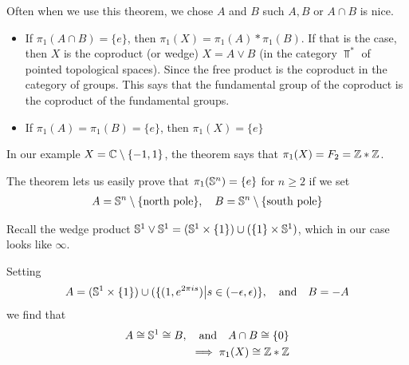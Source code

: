 
Often when we use this theorem, we chose $A$ and $B$ such $A,B$ or $A \cap B$ is nice.
\begin{itemize}
  \item If $\pi_1(A \cap B) = \{e\}$, then $\pi_1(X) = \pi_1(A) \ast \pi_1(B)$.
    If that is the case, then $X$ is the coproduct (or wedge) $X = A \vee B$ (in the category $\Top^{\ast}$ of pointed topological spaces).
    Since the free product is the coproduct in the category of groups. 
    This says that the fundamental group of the coproduct is the coproduct of the fundamental groups.
  \item If $\pi_1(A) = \pi_1(B) = \{e\}$, then $\pi_1(X) = \{e\}$
\end{itemize}


In our example $X = \mathbb{C} \setminus \{-1,1\}$, the theorem says that $\pi_1(X) = F_2 = \mathbb{Z} \ast \mathbb{Z}$.

The theorem lets us easily prove that $\pi_1(\mathbb{S}^{n}) = \{e\}$ for $n \geq 2$ if we set 
\begin{align*}
  A = \mathbb{S}^{n} \setminus \{\text{north pole}\}, \quad B = \mathbb{S}^{n} \setminus \{\text{south pole}\}
\end{align*}


\begin{ex}[]
  Recall the wedge product $\mathbb{S}^{1} \vee\mathbb{S}^{1} = (\mathbb{S}^{1} \times \{1\}) \cup (\{1\} \times \mathbb{S}^{1})$, which in our case looks like $\infty$.

  Setting
  \begin{align*}
    A = (\mathbb{S}^{1} \times \{1\}) \cup (\{(1,e^{2 \pi i s}) \big\vert s \in (-\epsilon,\epsilon)\}
    , \quad \text{and} \quad
    B = -A
  \end{align*}
  we find that
  \begin{align*}
    A \cong \mathbb{S}^{1} \cong B, \quad \text{and} \quad A \cap B \cong \{0\}\\
    \implies \pi_1(X) \cong \mathbb{Z} \ast \mathbb{Z}
  \end{align*}
\end{ex}

